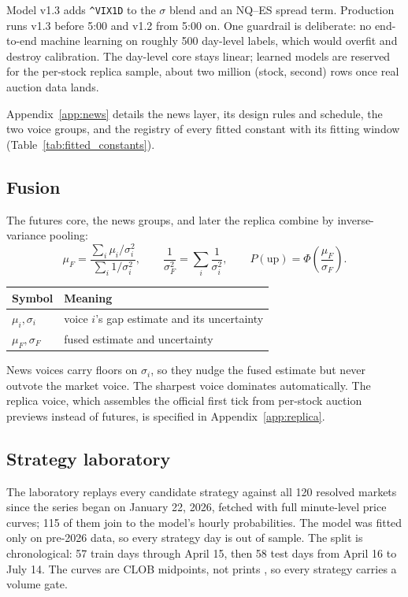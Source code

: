 Model v1.3 adds \texttt{\^{}VIX1D} to the $\sigma$ blend and an NQ--ES
spread term. Production runs v1.3 before 5:00 and v1.2 from 5:00 on. One
guardrail is deliberate: no end-to-end machine learning on roughly 500
day-level labels, which would overfit and destroy calibration. The
day-level core stays linear; learned models are reserved for the per-stock
replica sample, about two million (stock, second) rows once real auction
data lands.

Appendix~\ref{app:news} details the news layer, its design rules and
schedule, the two voice groups, and the registry of every fitted constant
with its fitting window (Table~\ref{tab:fitted_constants}).

\subsection{Fusion}
\label{sec:fusion}

The futures core, the news groups, and later the replica combine by
inverse-variance pooling:
\begin{equation}
\mu_F = \frac{\sum_i \mu_i / \sigma_i^2}{\sum_i 1/\sigma_i^2}, \qquad
\frac{1}{\sigma_F^2} = \sum_i \frac{1}{\sigma_i^2}, \qquad
P(\mathrm{up}) = \Phi\!\left(\frac{\mu_F}{\sigma_F}\right).
\label{eq:fusion}
\end{equation}

\begin{center}
\small
\begin{tabular}{ll}
\toprule
Symbol & Meaning \\
\midrule
$\mu_i, \sigma_i$ & voice $i$'s gap estimate and its uncertainty \\
$\mu_F, \sigma_F$ & fused estimate and uncertainty \\
\bottomrule
\end{tabular}
\end{center}

News voices carry floors on $\sigma_i$, so they nudge the fused estimate
but never outvote the market voice. The sharpest voice dominates
automatically. The replica voice, which assembles the official first tick
from per-stock auction previews instead of futures, is specified in
Appendix~\ref{app:replica}.

\subsection{Strategy laboratory}
\label{sec:strategy_lab}

The laboratory replays every candidate strategy against all 120 resolved
markets since the series began on January 22, 2026, fetched with full
minute-level price curves; 115 of them join to the model's hourly
probabilities. The model was fitted only on pre-2026 data, so every
strategy day is out of sample. The split is chronological: 57 train days
through April 15, then 58 test days from April 16 to July 14. The curves
are CLOB midpoints, not prints \citep{polymarket2026clob}, so every
strategy carries a volume gate.

